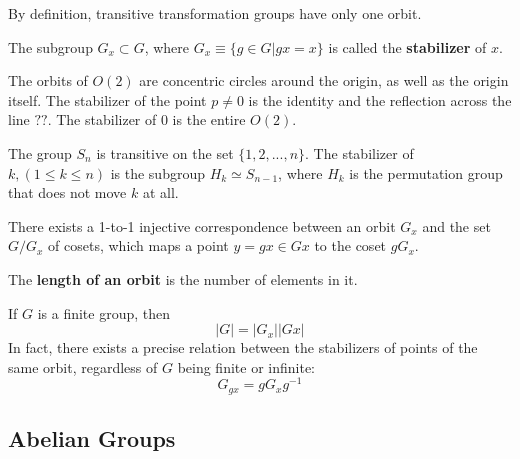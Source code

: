 \documentclass{article}
\begin{document}
    By definition, transitive transformation groups have only one orbit.

    \begin{definition}
      The subgroup $G_{x} \subset G$, where $G_{x} \equiv \{ g \in G | g x = x\}$ is called the \textbf{stabilizer} of $x$.
    \end{definition}

    \begin{example}
      The orbits of $O(2)$ are concentric circles around the origin, as well as the origin itself. The stabilizer of the point $p \neq 0$ is the identity and the reflection across the line $??$. The stabilizer of $0$ is the entire $O(2)$.
    \end{example}

    \begin{example}
      The group $S_n$ is transitive on the set $\{1, 2, ..., n\}$. The stabilizer of $k, (1 \leq k \leq n)$ is the subgroup $H_{k} \simeq S_{n-1}$, where $H_k$ is the permutation group that does not move $k$ at all. 
    \end{example}

    \begin{theorem}
      There exists a 1-to-1 injective correspondence between an orbit $G_x$ and the set $G / G_{x}$ of cosets, which maps a point $y = g x \in G x $ to the coset $g G_x$. 
    \end{theorem}

    \begin{definition}
      The \textbf{length of an orbit} is the number of elements in it. 
    \end{definition}

    \begin{corollary}
      If $G$ is a finite group, then 
      \begin{equation}
        |G| = |G_x| |G x|
      \end{equation}
      In fact, there exists a precise relation between the stabilizers of points of the same orbit, regardless of $G$ being finite or infinite: 
      \begin{equation}
        G_{g x} = g G_{x} g^{-1}
      \end{equation}
    \end{corollary}

  \subsection{Abelian Groups}
\end{document}
